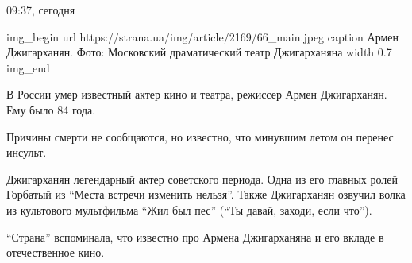  
 
 

09:37, сегодня

\ifcmt
img_begin 
	url https://strana.ua/img/article/2169/66_main.jpeg
	caption Армен Джигарханян. Фото: Московский драматический театр Джигарханяна
	width 0.7
img_end
\fi

В России умер известный актер кино и театра, режиссер Армен Джигарханян.
Ему было 84 года. 

Причины смерти не сообщаются, но известно, что минувшим летом он перенес
инсульт. 

Джигарханян \dshM легендарный актер советского периода. Одна из его главных
ролей \dshM Горбатый из \enquote{Места встречи изменить нельзя}. Также Джигарханян
озвучил волка из культового мультфильма \enquote{Жил был пес} (\enquote{Ты давай, заходи,
если что}). 

\enquote{Страна} вспоминала, что известно про Армена Джигарханяна и его вкладе в
отечественное кино. 

